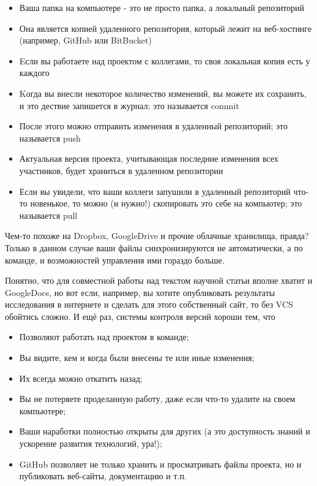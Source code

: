 \documentclass[11pt]{article}
\providecommand{\tightlist}{%
      \setlength{\itemsep}{0pt}\setlength{\parskip}{0pt}}
\begin{document}
\begin{itemize}
\tightlist
\item
  Ваша папка на компьютере - это не просто папка, а локальный
  репозиторий
\item
  Она является копией удаленного репозитория, который лежит на
  веб-хостинге (например, GitHub или BitBucket)
\item
  Eсли вы работаете над проектом с коллегами, то своя локальная копия
  есть у каждого
\item
  Kогда вы внесли некоторое количество изменений, вы можете их
  сохранить, и это дествие запишется в журнал; это называется commit
\item
  После этого можно отправить изменения в удаленный репозиторий; это
  называется push
\item
  Актуальная версия проекта, учитывающая последние изменения всех
  участников, будет храниться в удаленном репозитории
\item
  Если вы увидели, что ваши коллеги запушили в удаленный репозиторий
  что-то новенькое, то можно (и нужно!) скопировать это себе на
  компьютер; это называется pull
\end{itemize}

Чем-то похоже на Dropbox, GoogleDrive и прочие облачные хранилища,
правда? Только в данном случае ваши файлы синхронизируются не
автоматически, а по команде, и возможностей управления ими гораздо
больше.

Понятно, что для совместной работы над текстом научной статьи вполне
хватит и GoogleDocs, но вот если, например, вы хотите опубликовать
результаты исследования в интернете и сделать для этого собственный
сайт, то без VCS обойтись сложно. И ещё раз, системы контроля версий
хороши тем, что

\begin{itemize}
\tightlist
\item
  Позволяют работать над проектом в команде;
\item
  Вы видите, кем и когда были внесены те или иные изменения;
\item
  Их всегда можно откатить назад;
\item
  Вы не потеряете проделанную работу, даже если что-то удалите на своем
  компьютере;
\item
  Ваши наработки полностью открыты для других (а это доступность знаний
  и ускорение развития технологий, ура!);
\item
  GitHub позволяет не только хранить и просматривать файлы проекта, но и
  публиковать веб-сайты, документацию и т.п.
\end{itemize}
\end{document}
